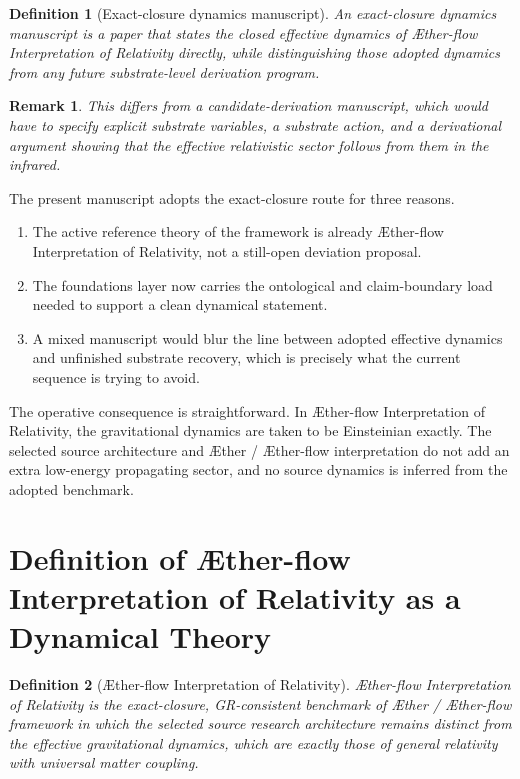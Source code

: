 \documentclass[11pt]{article}
\newcommand{\Aether}{\AE{}ther}
\newcommand{\Aflow}{\AE{}ther-flow}
\newcommand{\TheoryName}{\Aflow{} Interpretation of Relativity}
\newcommand{\TheoryProgram}{\Aether{} / \Aflow{} framework}
\newtheorem{definition}{Definition}
\newtheorem{remark}{Remark}
\begin{document}
\begin{definition}[Exact-closure dynamics manuscript]
An exact-closure dynamics manuscript is a paper that states the closed effective dynamics of \TheoryName{} directly, while distinguishing those adopted dynamics from any future substrate-level derivation program.
\end{definition}

\begin{remark}
This differs from a candidate-derivation manuscript, which would have to specify explicit substrate variables, a substrate action, and a derivational argument showing that the effective relativistic sector follows from them in the infrared.
\end{remark}

The present manuscript adopts the exact-closure route for three reasons.
\begin{enumerate}
    \item The active reference theory of the framework is already \TheoryName{}, not a still-open deviation proposal.
    \item The foundations layer now carries the ontological and claim-boundary load needed to support a clean dynamical statement.
    \item A mixed manuscript would blur the line between adopted effective dynamics and unfinished substrate recovery, which is precisely what the current sequence is trying to avoid.
\end{enumerate}

The operative consequence is straightforward. In \TheoryName{}, the
gravitational dynamics are taken to be Einsteinian exactly. The selected
source architecture and \Aether{} / \Aflow{} interpretation do not add an
extra low-energy propagating sector, and no source dynamics is inferred from
the adopted benchmark.

\section{Definition of \TheoryName{} as a Dynamical Theory}

\begin{definition}[\TheoryName{}]
\TheoryName{} is the exact-closure, GR-consistent benchmark of
\TheoryProgram{} in which the selected source research architecture remains
distinct from the effective gravitational dynamics, which are exactly those
of general relativity with universal matter coupling.
\end{definition}
\end{document}
